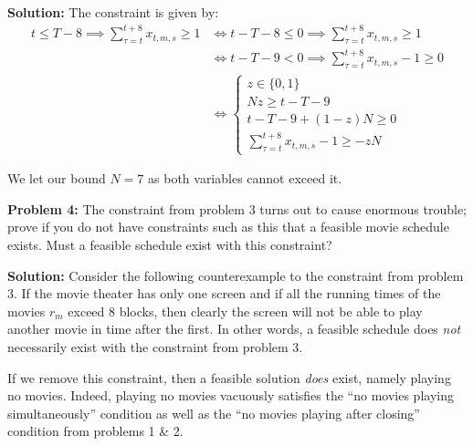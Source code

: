 \documentclass{article}
\begin{document}
\noindent\textbf{Solution:} The constraint is given by:
\begin{align*}
    t\le T-8\implies\sum_{\tau=t}^{t+8}x_{t,m,s}\ge 1&\iff t-T-8\le0\implies\sum_{\tau=t}^{t+8}x_{t,m,s}\ge 1\\
    &\iff t-T-9<0\implies\sum_{\tau=t}^{t+8}x_{t,m,s}-1\ge 0\\
    &\iff\begin{cases}
        z\in\{0,1\}\\
        Nz\ge t-T-9\\
        t-T-9+(1-z)N\ge 0\\
        \sum_{\tau=t}^{t+8}x_{t,m,s}-1\ge -zN
    \end{cases}
\end{align*}

We let our bound $N=7$ as both variables cannot exceed it.
\bigskip

\noindent\textbf{Problem 4:} The constraint from problem 3 turns out to cause enormous trouble; prove if you do not have constraints such as this that a feasible movie schedule exists. Must a feasible schedule exist with this constraint?
\bigskip

\noindent\textbf{Solution:} Consider the following counterexample to the constraint from problem 3. If the movie theater has only one screen and if all the running times of the movies $r_m$ exceed 8 blocks, then clearly the screen will not be able to play another movie in time after the first. In other words, a feasible schedule does \textit{not} necessarily exist with the constraint from problem 3.

If we remove this constraint, then a feasible solution \textit{does} exist, namely playing no movies. Indeed, playing no movies vacuously satisfies the ``no movies playing simultaneously'' condition as well as the ``no movies playing after closing'' condition from problems 1 \& 2.
\end{document}
